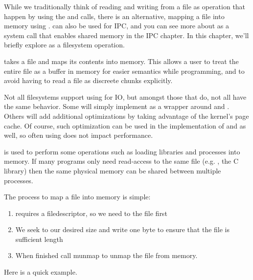 While we traditionally think of reading and writing from a file as operation that happen by using the  and  calls, there is an alternative, mapping a file into memory using .  can also be used for IPC, and you can see more about  as a system call that enables shared memory in the IPC chapter. In this chapter, we'll briefly explore  as a filesystem operation.

 takes a file and maps its contents into memory. This allows a user to treat the entire file as a buffer in memory for easier semantics while programming, and to avoid having to read a file as discreete chunks explicitly.

Not all filesystems support using  for IO, but amongst those that do, not all have the same behavior. Some will simply implement  as a wrapper around  and . Others will add additional optimizations by taking advantage of the kernel's page cache. Of course, such optimization can be used in the implementation of  and  as well, so often using  does not impact performance.

 is used to perform some operations such as loading libraries and processes into memory. If many programs only need read-access to the same file (e.g. , the C library) then the same physical memory can be shared between multiple processes.

The process to map a file into memory is simple:

\begin{enumerate}
\item {} requires a filedescriptor, so we need to  the file first
\item We seek to our desired size and write one byte to ensure that the file is sufficient length
\item When finished call munmap to unmap the file from memory.
\end{enumerate}

Here is a quick example.

